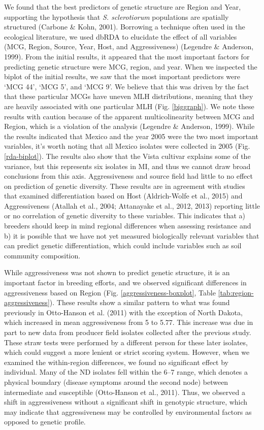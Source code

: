 We found that the best predictors of genetic structure are Region and
Year, supporting the hypothesis that \emph{S. sclerotiorum} populations
are spatially structured (Carbone \& Kohn, 2001). Borrowing a technique
often used in the ecological literature, we used dbRDA to elucidate the
effect of all variables (MCG, Region, Source, Year, Host, and
Aggressiveness) (Legendre \& Anderson, 1999). From the initial results,
it appeared that the most important factors for predicting genetic
structure were MCG, region, and year. When we inspected the biplot of
the initial results, we saw that the most important predictors were `MCG
44', `MCG 5', and `MCG 9'. We believe that this was driven by the fact
that these particular MCGs have uneven MLH distributions, meaning that
they are heavily associated with one particular MLH (Fig.
\ref{biggraph}). We note these results with caution because of the
apparent multicolinearity between MCG and Region, which is a violation
of the analysis (Legendre \& Anderson, 1999). While the results
indicated that Mexico and the year 2005 were the two most important
variables, it's worth noting that all Mexico isolates were collected in
2005 (Fig. \ref{rda-biplot}). The results also show that the Vista
cultivar explains some of the variance, but this represents six isolates
in MI, and thus we cannot draw broad conclusions from this axis.
Aggressiveness and source field had little to no effect on prediction of
genetic diversity. These results are in agreement with studies that
examined differentiation based on Host (Aldrich-Wolfe et al., 2015) and
Aggressiveness (Atallah et al., 2004; Attanayake et al., 2012, 2013)
reporting little or no correlation of genetic diversity to these
variables. This indicates that a) breeders should keep in mind regional
differences when assessing resistance and b) it is possible that we have
not yet measured biologically relevant variables that can predict
genetic differentiation, which could include variables such as soil
community composition.

While aggressiveness was not shown to predict genetic structure, it is
an important factor in breeding efforts, and we observed significant
differences in aggressiveness based on Region (Fig.
\ref{aggressiveness-boxplot}, Table \ref{tab:region-aggressiveness}).
These results show a similar pattern to what was found previously in
Otto-Hanson et al. (2011) with the exception of North Dakota, which
increased in mean aggressiveness from 5 to 5.77. This increase was due
in part to new data from producer field isolates collected after the
previous study. These straw tests were performed by a different person
for these later isolates, which could suggest a more lenient or strict
scoring system. However, when we examined the within-region differences,
we found no significant effect by individual. Many of the ND isolates
fell within the 6--7 range, which denotes a physical boundary (disease
symptoms around the second node) between intermediate and susceptible
(Otto-Hanson et al., 2011). Thus, we observed a shift in aggressiveness
without a significant shift in genotypic structure, which may indicate
that aggressiveness may be controlled by environmental factors as
opposed to genetic profile.

